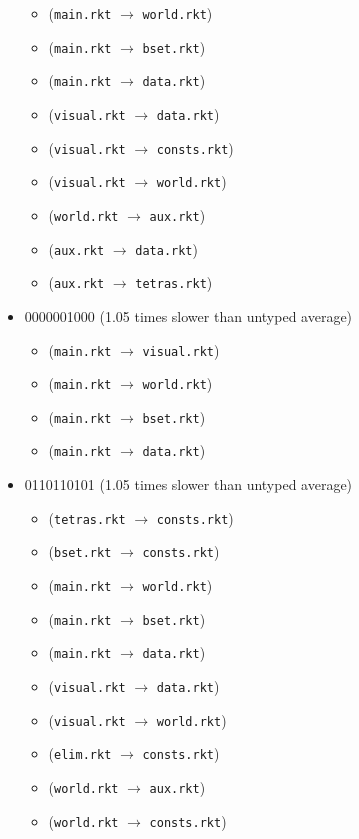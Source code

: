 \documentclass{article}
\newcommand{\mono}[1]{\texttt{#1}}
\begin{document}
\begin{itemize}
\begin{itemize}
  \item (\mono{main.rkt} $\rightarrow$ \mono{world.rkt})
  \item (\mono{main.rkt} $\rightarrow$ \mono{bset.rkt})
  \item (\mono{main.rkt} $\rightarrow$ \mono{data.rkt})
  \item (\mono{visual.rkt} $\rightarrow$ \mono{data.rkt})
  \item (\mono{visual.rkt} $\rightarrow$ \mono{consts.rkt})
  \item (\mono{visual.rkt} $\rightarrow$ \mono{world.rkt})
  \item (\mono{world.rkt} $\rightarrow$ \mono{aux.rkt})
  \item (\mono{aux.rkt} $\rightarrow$ \mono{data.rkt})
  \item (\mono{aux.rkt} $\rightarrow$ \mono{tetras.rkt})
  \end{itemize}
\item 0000001000 (1.05 times slower than untyped average)
  \begin{itemize}
  \item (\mono{main.rkt} $\rightarrow$ \mono{visual.rkt})
  \item (\mono{main.rkt} $\rightarrow$ \mono{world.rkt})
  \item (\mono{main.rkt} $\rightarrow$ \mono{bset.rkt})
  \item (\mono{main.rkt} $\rightarrow$ \mono{data.rkt})
  \end{itemize}
\item 0110110101 (1.05 times slower than untyped average)
  \begin{itemize}
  \item (\mono{tetras.rkt} $\rightarrow$ \mono{consts.rkt})
  \item (\mono{bset.rkt} $\rightarrow$ \mono{consts.rkt})
  \item (\mono{main.rkt} $\rightarrow$ \mono{world.rkt})
  \item (\mono{main.rkt} $\rightarrow$ \mono{bset.rkt})
  \item (\mono{main.rkt} $\rightarrow$ \mono{data.rkt})
  \item (\mono{visual.rkt} $\rightarrow$ \mono{data.rkt})
  \item (\mono{visual.rkt} $\rightarrow$ \mono{world.rkt})
  \item (\mono{elim.rkt} $\rightarrow$ \mono{consts.rkt})
  \item (\mono{world.rkt} $\rightarrow$ \mono{aux.rkt})
  \item (\mono{world.rkt} $\rightarrow$ \mono{consts.rkt})

\end{itemize}
\end{itemize}
\end{document}
